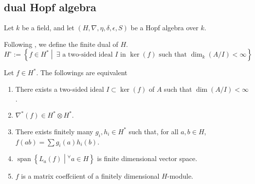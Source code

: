 
\subsection*{dual Hopf algebra}

Let $k$ be a field, and let $(H, \nabla, \eta, \delta, \epsilon, S)$ be a Hopf algebra over $k$.

Following \cite{DNR}, we define the finite dual of $H$.
\[
H^\circ := \left\{ f \in H^* \middle| \ \exists \text{ a two-sided ideal } I \text{ in } \ker(f) \text{ such that } \dim_k(A/I) < \infty \right\}
\]

\begin{proposition}
    Let $f \in H^*$.
    The followings are equivalent

    \begin{enumerate}
        \item There exists a two-sided ideal $I \subset \ker(f)$ of $A$ such that $\dim(A/I) < \infty$.
        \item $\nabla^*(f)\in H^* \otimes H^*$.
        \item There exists finitely many $g_i, h_i \in H^*$ such that, for all $a, b \in H$, $f(ab) = \sum g_i(a) h_i(b)$.
        \item $\operatorname{span} \left\{ L_a(f) \middle| ^\forall a \in H \right\}$ is finite dimensional vector space.
        \item $f$ is a matrix coeffciient of a finitely dimensional $H$-module.
    \end{enumerate}

\end{proposition}
